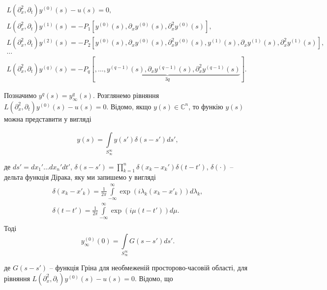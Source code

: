 \begin{gather*}
    L(\partial_x^2, \partial_t)y^{(0)}(s) - u(s) = 0,\\
    L(\partial_x^2, \partial_t)y^{(1)}(s) = -P_{1}
    \left[
    y^{(0)}(s), \partial_x y^{(0)}(s), \partial_x^2 y^{(0)}(s)
    \right], \\
    L(\partial_x^2, \partial_t)y^{(2)}(s) = -P_{2}
    \left[
    y^{(0)}(s), \partial_x y^{(0)}(s), \partial_x^2 y^{(0)}(s),
    y^{(1)}(s), \partial_x y^{(1)}(s), \partial_x^2 y^{(1)}(s)
    \right],\\
    \dots\\
    L(\partial_x^2, \partial_t)y^{(q)}(s) = -P_{q}
    \left[
        \underbrace{
            ,\dots,
            y^{(q-1)}(s), \partial_x y^{(q-1)}(s), \partial_x^2 y^{(q-1)}(s)
        }_{3q}
        \right].
\end{gather*}

Позначимо $y^{q}(s)=y_{\infty}^{q}(s)$.
Розглянемо рівняння $L(\partial_x^2, \partial_t)y^{(0)}(s) - u(s) = 0$.
Відомо, якщо $y(s)\in\mathbb{C}^{n}$, то функію $y(s)$ можна представити у вигляді

\[
    y(s) = \int\limits_{S_{\infty}^{\infty}}^{}y(s')\delta(s-s')ds',
\]

де $ds'=dx_{1}'\dots dx_{n}'dt'$, $\delta(s-s')= \prod\limits_{k=1}^{n}\delta(x_{k} - x_{k}')\delta(t-t')$,
$\delta(\cdot)$ -- дельта функція Дірака, яку ми запишемо у вигляді
\begin{gather*}
    \delta(x_{k} - x'_{k})=\frac{1}{2\pi}\int\limits_{-\infty}^{\infty}\exp(i\lambda_{k}(x_{k}-x'_{k}))d\lambda_{k},\\
    \delta(t - t')=\frac{1}{2\pi}\int\limits_{-\infty}^{\infty}\exp(i\mu(t-t'))d\mu.\\
\end{gather*}
Тоді
\[
    y^{(0)}_{\infty}(0)=\int\limits_{S_{\infty}^{\infty}}G(s-s')ds'.
\]

де $G(s-s')$ -- функція Гріна для необмеженій просторово-часовій області, для рівняння
$L(\partial_x^2, \partial_t)y^{(0)}(s) - u(s) = 0$.
Відомо, що

